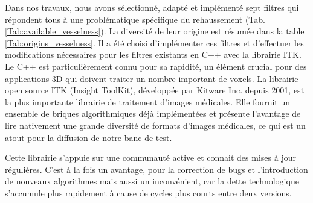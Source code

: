 Dans nos travaux, nous avons sélectionné, adapté et implémenté sept filtres qui répondent tous à une problématique spécifique du rehaussement (Tab. \ref{Tab:available_vesselness}). La diversité de leur origine est résumée dans la table \ref{Tab:origins_vesselness}. Il a été choisi d'implémenter ces filtres et d'effectuer les modifications nécessaires pour les filtres existants en C++ avec la librairie ITK. Le C++ est particulièrement connu pour sa rapidité, un élément crucial pour des applications 3D qui doivent traiter un nombre important de voxels. La librairie open source ITK (Insight ToolKit), développée par Kitware Inc. depuis 2001, est la plus importante librairie de traitement d'images médicales. Elle fournit un ensemble de briques algorithmiques déjà implémentées et présente l'avantage de lire nativement une grande diversité de formats d'images médicales, ce qui est un atout pour la diffusion de notre banc de test.

Cette librairie s'appuie sur une communauté active et connait des mises à jour régulières. C'est à la fois un avantage, pour la correction de bugs et l'introduction de nouveaux algorithmes mais aussi un inconvénient, car la dette technologique s'accumule plus rapidement à cause de cycles plus courts entre deux versions.


\begin{table}
    \begin{center}
  \end{center}
  \caption{Méthodes disponibles et idées principales guidant leur conception.}
  \label{Tab:available_vesselness}

  \end{table}

